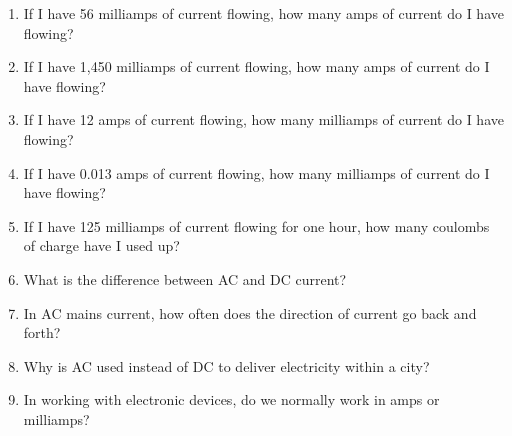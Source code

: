 
\begin{enumerate}
\item If I have 56 milliamps of current flowing, how many amps of current do I have flowing?
\item If I have 1,450 milliamps of current flowing, how many amps of current do I have flowing?
\item If I have 12 amps of current flowing, how many milliamps of current do I have flowing?
\item If I have 0.013 amps of current flowing, how many milliamps of current do I have flowing?
\item If I have 125 milliamps of current flowing for one hour, how many coulombs of charge have I used up?
\item What is the difference between AC and DC current?
\item In AC mains current, how often does the direction of current go back and forth?
\item Why is AC used instead of DC to deliver electricity within a city?
\item In working with electronic devices, do we normally work in amps or milliamps?
\end{enumerate}
